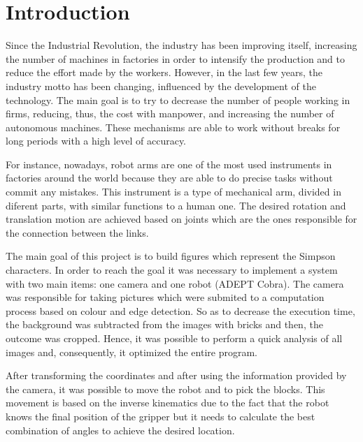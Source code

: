 \chapter{Introduction}\label{ch:introduction}

Since the Industrial Revolution, the industry has been improving itself, increasing the number of machines in factories in order to intensify the production and to reduce the effort made by the workers. However, in the last few years, the industry motto has been changing, influenced by the development of the technology. The main goal is to try to decrease the number of people working in firms, reducing, thus, the cost with manpower, and increasing the number of autonomous machines. These mechanisms are able to work without breaks for long periods with a high level of accuracy. 

For instance, nowadays, robot arms are one of the most used instruments in factories around the world because they are able to do precise tasks without commit any mistakes. This instrument is a type of mechanical arm, divided in diferent parts, with similar functions to a human one. The desired rotation and translation motion are achieved based on joints which are the ones responsible for the connection between the links. 

The main goal of this project is to build figures which represent the Simpson characters. In order to reach the goal it was necessary to implement a system with two main items: one camera and one robot (ADEPT Cobra). The camera was responsible for taking pictures which were submited to a computation process based on colour and edge detection. So as to decrease the execution time, the background was subtracted from the images with bricks and then, the outcome was cropped. Hence, it was possible to perform a quick analysis of all images and, consequently, it optimized the entire program.

After transforming the coordinates and after using the information provided by the camera, it was possible to move the robot and to pick the blocks. This movement is based on the inverse kinematics due to the fact that the robot knows the final position of the gripper but it needs to calculate the best combination of angles to achieve the desired location.

